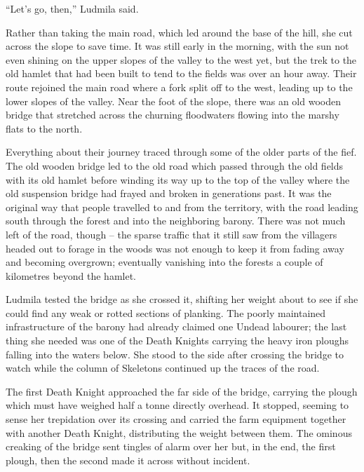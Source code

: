 “Let’s go, then,” Ludmila said.

 

Rather than taking the main road, which led around the base of the hill, she cut across the slope to save time. It was still early in the morning, with the sun not even shining on the upper slopes of the valley to the west yet, but the trek to the old hamlet that had been built to tend to the fields was over an hour away. Their route rejoined the main road where a fork split off to the west, leading up to the lower slopes of the valley. Near the foot of the slope, there was an old wooden bridge that stretched across the churning floodwaters flowing into the marshy flats to the north.

 

Everything about their journey traced through some of the older parts of the fief. The old wooden bridge led to the old road which passed through the old fields with its old hamlet before winding its way up to the top of the valley where the old suspension bridge had frayed and broken in generations past. It was the original way that people travelled to and from the territory, with the road leading south through the forest and into the neighboring barony. There was not much left of the road, though – the sparse traffic that it still saw from the villagers headed out to forage in the woods was not enough to keep it from fading away and becoming overgrown; eventually vanishing into the forests a couple of kilometres beyond the hamlet.

 

Ludmila tested the bridge as she crossed it, shifting her weight about to see if she could find any weak or rotted sections of planking. The poorly maintained infrastructure of the barony had already claimed one Undead labourer; the last thing she needed was one of the Death Knights carrying the heavy iron ploughs falling into the waters below. She stood to the side after crossing the bridge to watch while the column of Skeletons continued up the traces of the road.

 

The first Death Knight approached the far side of the bridge, carrying the plough which must have weighed half a tonne directly overhead. It stopped, seeming to sense her trepidation over its crossing and carried the farm equipment together with another Death Knight, distributing the weight between them. The ominous creaking of the bridge sent tingles of alarm over her but, in the end, the first plough, then the second made it across without incident.

